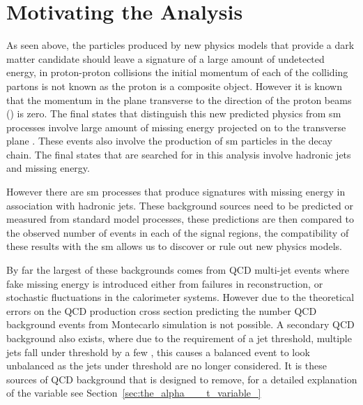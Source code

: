 
\section{Motivating the \alt Analysis} %
\label{cha:motivating_the_alt_analysis}

As seen above, the particles produced by new physics models that provide a dark 
matter candidate should leave a signature of a large amount of undetected 
energy, in proton-proton collisions the initial momentum of each of the 
colliding partons is not known as the proton is a composite object. However it 
is known that the momentum in the plane transverse to the direction of the 
proton beams (\pt) is zero. The final states that distinguish this new 
predicted physics from \ac{sm} processes involve large amount of missing energy 
projected on to the transverse plane \ETm. These events also involve the 
production of \ac{sm} particles in the decay chain. The final states that are 
searched for in this analysis involve hadronic jets and missing energy.

However there are \ac{sm} processes that produce signatures with missing energy 
in association with hadronic jets. These background sources need to be 
predicted or measured from standard model processes, these predictions are then 
compared to the observed number of events in each of the signal regions, the 
compatibility of these results with the \ac{sm} allows us to discover or rule 
out new physics models.


By far the largest of these backgrounds comes from QCD multi-jet events where 
fake missing energy is introduced either from failures in reconstruction, or 
stochastic fluctuations in the calorimeter systems.
However due to the theoretical errors on the QCD production cross section 
predicting the number QCD background events from Montecarlo simulation is not 
possible. A secondary QCD background also exists, where due to the requirement 
of a jet \ET threshold, multiple jets fall under threshold by a few \GeV, this 
causes a balanced event to look unbalanced as the jets under threshold are no 
longer considered. It is these sources of QCD background that \alt is designed 
to remove, for a detailed explanation of the \alt variable see 
Section~\ref{sec:the_alpha___t_variable_}


